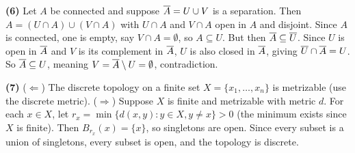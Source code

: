 \documentclass{report}
\begin{document}
\begin{solution}
\textbf{(6)} Let \(A\) be connected and suppose \(\overline{A} = U \cup V\) is a separation. Then \(A = (U \cap A) \cup (V \cap A)\) with \(U \cap A\) and \(V \cap A\) open in \(A\) and disjoint. Since \(A\) is connected, one is empty, say \(V \cap A = \emptyset\), so \(A \subseteq U\). But then \(\overline{A} \subseteq \overline{U}\). Since \(U\) is open in \(\overline{A}\) and \(V\) is its complement in \(\overline{A}\), \(U\) is also closed in \(\overline{A}\), giving \(\overline{U} \cap \overline{A} = U\). So \(\overline{A} \subseteq U\), meaning \(V = \overline{A} \setminus U = \emptyset\), contradiction.

\textbf{(7)} (\(\Leftarrow\)) The discrete topology on a finite set \(X = \{x_1, \ldots, x_n\}\) is metrizable (use the discrete metric). (\(\Rightarrow\)) Suppose \(X\) is finite and metrizable with metric \(d\). For each \(x \in X\), let \(r_x = \min\{d(x, y) : y \in X, y \neq x\} > 0\) (the minimum exists since \(X\) is finite). Then \(B_{r_x}(x) = \{x\}\), so singletons are open. Since every subset is a union of singletons, every subset is open, and the topology is discrete.
\end{solution}
\end{document}
